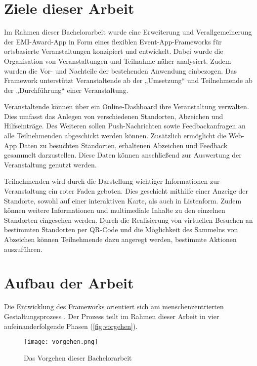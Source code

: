 \section{Ziele dieser Arbeit} \label{sec:goals}

Im Rahmen dieser Bachelorarbeit wurde eine Erweiterung und Verallgemeinerung der
EMI-Award-App in Form eines flexiblen Event-App-Frameworks für ortsbasierte
Veranstaltungen konzipiert und entwickelt. Dabei wurde die Organisation von
Veranstaltungen und Teilnahme näher analysiert. Zudem wurden die Vor- und
Nachteile der bestehenden Anwendung einbezogen. Das Framework unterstützt
Veranstaltende ab der „Umsetzung“ und Teilnehmende ab der „Durchführung“ einer Veranstaltung.

Veranstaltende können über ein Online-Dashboard ihre Veranstaltung verwalten.
Dies umfasst das Anlegen von verschiedenen Standorten, Abzeichen und
Hilfseinträge. Des Weiteren sollen Push-Nachrichten sowie Feedbackanfragen an
alle Teilnehmenden abgeschickt werden können. Zusätzlich ermöglicht die Web-App
Daten zu besuchten Standorten, erhaltenen Abzeichen und Feedback gesammelt
darzustellen. Diese Daten können anschließend zur Auswertung der Veranstaltung
genutzt werden.

Teilnehmenden wird durch die Darstellung wichtiger Informationen
zur Veranstaltung ein roter Faden geboten. Dies geschieht mithilfe einer
Anzeige der Standorte, sowohl auf einer interaktiven Karte, als auch in
Listenform. Zudem können weitere Informationen und multimediale Inhalte zu den
einzelnen Standorten eingesehen werden. Durch die Realisierung von virtuellen Besuchen an bestimmten Standorten per QR-Code und die Möglichkeit des Sammelns von Abzeichen können Teilnehmende dazu angeregt werden, bestimmte Aktionen auszuführen.

\section{Aufbau der Arbeit}

Die Entwicklung des Frameworks orientiert sich am menschenzentrierten
Gestaltungsprozess . Der Prozess teilt im Rahmen dieser
Arbeit in vier aufeinanderfolgende Phasen (\autoref{fig:vorgehen}).

\begin{figure}[htpb]
    \centering
    \texttt{[image: vorgehen.png]}
    \caption{Das Vorgehen dieser Bachelorarbeit}
    \label{fig:vorgehen}
\end{figure}

